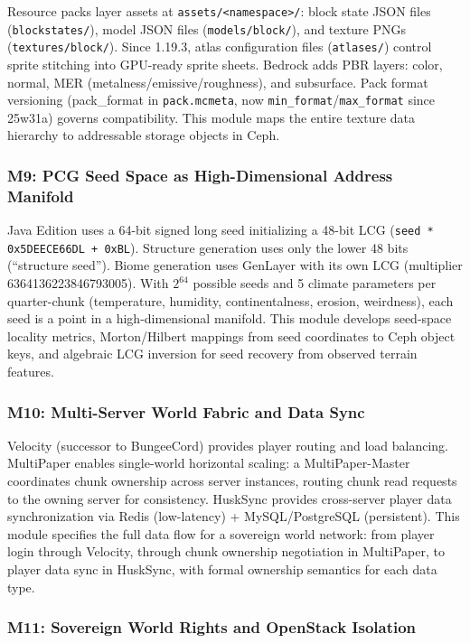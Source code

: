 \documentclass[11pt,letterpaper]{article}
\begin{document}
Resource packs layer assets at \texttt{assets/<namespace>/}: block state JSON files (\texttt{blockstates/}), model JSON files (\texttt{models/block/}), and texture PNGs (\texttt{textures/block/}). Since 1.19.3, atlas configuration files (\texttt{atlases/}) control sprite stitching into GPU-ready sprite sheets. Bedrock adds PBR layers: color, normal, MER (metalness/emissive/roughness), and subsurface. Pack format versioning (pack\_format in \texttt{pack.mcmeta}, now \texttt{min\_format}/\texttt{max\_format} since 25w31a) governs compatibility. This module maps the entire texture data hierarchy to addressable storage objects in Ceph.

\subsubsection{M9: PCG Seed Space as High-Dimensional Address Manifold}

Java Edition uses a 64-bit signed long seed initializing a 48-bit LCG (\texttt{seed * 0x5DEECE66DL + 0xBL}). Structure generation uses only the lower 48 bits (``structure seed''). Biome generation uses GenLayer with its own LCG (multiplier 6364136223846793005). With $2^{64}$ possible seeds and 5 climate parameters per quarter-chunk (temperature, humidity, continentalness, erosion, weirdness), each seed is a point in a high-dimensional manifold. This module develops seed-space locality metrics, Morton/Hilbert mappings from seed coordinates to Ceph object keys, and algebraic LCG inversion for seed recovery from observed terrain features.

\subsubsection{M10: Multi-Server World Fabric and Data Sync}

Velocity (successor to BungeeCord) provides player routing and load balancing. MultiPaper enables single-world horizontal scaling: a MultiPaper-Master coordinates chunk ownership across server instances, routing chunk read requests to the owning server for consistency. HuskSync provides cross-server player data synchronization via Redis (low-latency) + MySQL/PostgreSQL (persistent). This module specifies the full data flow for a sovereign world network: from player login through Velocity, through chunk ownership negotiation in MultiPaper, to player data sync in HuskSync, with formal ownership semantics for each data type.

\subsubsection{M11: Sovereign World Rights and OpenStack Isolation}
\end{document}
